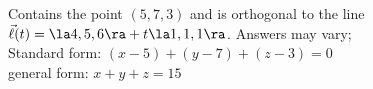 {Contains the point $(5,7,3)$ and is orthogonal to the line\\
$\vec\ell(t) =  \la 4,5,6\ra+ t\la 1,1,1\ra$.
}
{Answers may vary;\\
Standard form: $(x-5)+(y-7)+(z-3)=0$\\
general form: $x+y+z=15$
}

